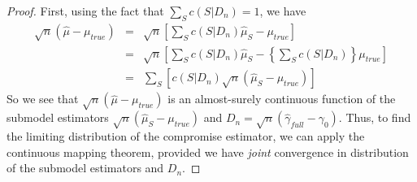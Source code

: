 \begin{proof}
First, using the fact that $\sum_S c(S|D_n) = 1$, we have
	\begin{eqnarray*}
		\sqrt{n}\left( \hat{\mu} -\mu_{true} \right) &=& \sqrt{n}\left[\sum_{S} c(S|D_n)\hat{\mu}_S - \mu_{true} \right]\\
			&=& \sqrt{n}\left[\sum_{S} c(S|D_n)\hat{\mu}_S - \left\{\sum_{S} c(S|D_n)\right\}\mu_{true} \right]\\
			&=&\sum_S \left[ c(S|D_n) \sqrt{n}\left( \hat{\mu}_S -\mu_{true} \right)  \right]
\end{eqnarray*}
So we see that $\sqrt{n}\left( \hat{\mu} -\mu_{true} \right)$ is an almost-surely continuous function of the submodel estimators $\sqrt{n}\left( \hat{\mu}_S -\mu_{true} \right)$ and $D_n = \sqrt{n}\left( \hat{\gamma}_{full} - \gamma_0 \right)$. Thus, to find the limiting distribution of the compromise estimator, we can apply the continuous mapping theorem, provided we have \emph{joint} convergence in distribution of the submodel estimators and $D_n$.


\end{proof}

